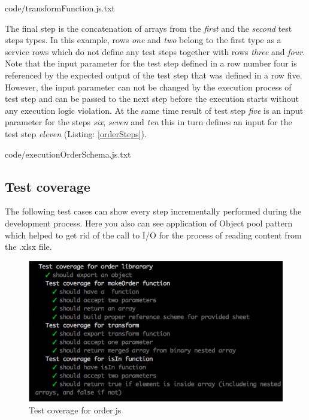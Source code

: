 
{code/transformFunction.js.txt}

The final step is the  concatenation of arrays from the \textit{first} and the \textit{second} test steps types. In this example, rows \textit{one} and \textit{two} belong to the first type as a service rows which do not define any test steps together with rows \textit{three} and \textit{four}. Note that the input parameter for the test step defined in a row number four is referenced by the expected output of the test step that was defined in a row five. However, the input parameter can not be changed by the execution process of test step and can be passed to the next step before the execution starts without any execution logic violation. At the same time result of test step \textit{five} is an input parameter for the steps \textit{six}, \textit{seven} and \textit{ten} this in turn defines an input for the test step \textit{eleven} (Listing: \ref{orderSteps}).

{code/executionOrderSchema.js.txt}


\subsection{Test coverage}

The following test cases can show every step incrementally performed during the development process. Here you also can see application of Object pool pattern which helped to get rid of the call to I/O for the process of reading content from the .xlsx file.
\begin{figure}[H]
	\centering
	\includegraphics[width=\linewidth]{grafiken/testOrder.png}
	\caption{Test coverage for order.js}
	\label{fig:testOrder}
\end{figure}

